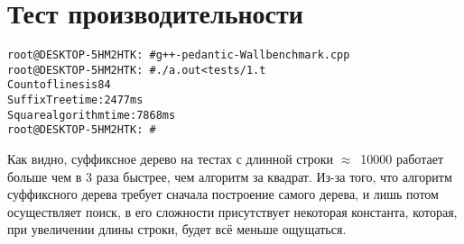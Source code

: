 \section{Тест производительности}

\begin{alltt}
root@DESKTOP-5HM2HTK:~# g++ -pedantic -Wall benchmark.cpp
root@DESKTOP-5HM2HTK:~# ./a.out <tests/1.t
Count of lines is 84
Suffix Tree time: 2477ms
Square algorithm time: 7868ms
root@DESKTOP-5HM2HTK:~#
\end{alltt}

Как видно, суффиксное дерево на тестах с длинной строки $ \approx $\ 10000 работает больше чем в 3 раза быстрее, чем алгоритм за квадрат. Из-за того, что алгоритм суффиксного дерева требует сначала построение самого дерева, и лишь потом осуществляет поиск, в его сложности присутствует некоторая константа, которая, при увеличении длины строки, будет всё меньше ощущаться.

\pagebreak

